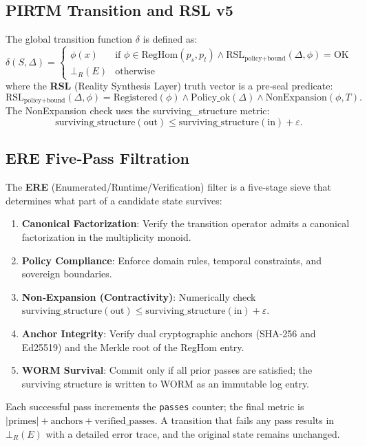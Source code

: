 \documentclass[11pt,a4paper]{article}
\theoremstyle{definition}
\theoremstyle{remark}
\begin{document}
\subsection{PIRTM Transition and RSL v5}
\label{subsec:pirtm_v5}
The global transition function $\delta$ is defined as:
\begin{equation}
\delta(S, \Delta) = 
\begin{cases}
\phi(x) & \text{if } \phi \in \text{RegHom}(p_s, p_t) \land \text{RSL}_{\text{policy+bound}}(\Delta, \phi) = \text{OK} \\
\bot_R(E) & \text{otherwise}
\end{cases}
\end{equation}
where the \textbf{RSL} (Reality Synthesis Layer) truth vector is a pre‑seal predicate:
\[
\text{RSL}_{\text{policy+bound}}(\Delta, \phi) = \text{Registered}(\phi) \land \text{Policy\_ok}(\Delta) \land \text{NonExpansion}(\phi, T).
\]
The NonExpansion check uses the surviving\_structure metric:
\[
\text{surviving\_structure}(\text{out}) \le \text{surviving\_structure}(\text{in}) + \varepsilon.
\]

\subsection{ERE Five‑Pass Filtration}
\label{subsec:ere}
The \textbf{ERE} (Enumerated/Runtime/Verification) filter is a five‑stage sieve that determines what part of a candidate state survives:
\begin{enumerate}[noitemsep]
    \item \textbf{Canonical Factorization}: Verify the transition operator admits a canonical factorization in the multiplicity monoid.
    \item \textbf{Policy Compliance}: Enforce domain rules, temporal constraints, and sovereign boundaries.
    \item \textbf{Non‑Expansion (Contractivity)}: Numerically check $\text{surviving\_structure}(\text{out}) \le \text{surviving\_structure}(\text{in}) + \varepsilon$.
    \item \textbf{Anchor Integrity}: Verify dual cryptographic anchors (SHA‑256 and Ed25519) and the Merkle root of the RegHom entry.
    \item \textbf{WORM Survival}: Commit only if all prior passes are satisfied; the surviving structure is written to WORM as an immutable log entry.
\end{enumerate}
Each successful pass increments the \texttt{passes} counter; the final metric is $|\text{primes}| + \text{anchors} + \text{verified\_passes}$. A transition that fails any pass results in $\bot_R(E)$ with a detailed error trace, and the original state remains unchanged.
\end{document}
